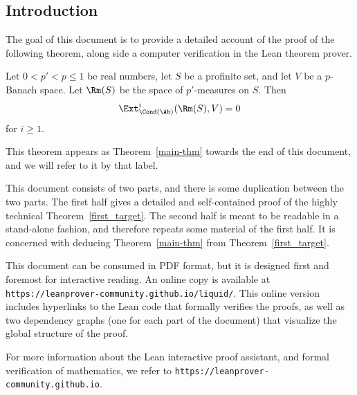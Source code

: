 \subsection*{Introduction}
\label{intro}

The goal of this document is to provide a detailed account
of the proof of the following theorem,
along side a computer verification in the Lean theorem prover.

\begin{theoremx}
  \label{main-goal}
  Let $0 < p' < p \le 1$ be real numbers,
  let $S$ be a profinite set,
  and let $V$ be a $p$-Banach space.
  Let $\Rm(S)$ be the space of $p'$-measures on $S$.
  Then
  \[
    \Ext^i_{\Cond(\Ab)}(\Rm(S), V)=0
  \]
  for $i \ge 1$.
\end{theoremx}

This theorem appears as Theorem~\ref{main-thm} towards the end of this document,
and we will refer to it by that label.

This document consists of two parts, and there is some duplication between the two parts.
The first half gives a detailed and self-contained proof of the highly technical Theorem~\ref{first_target}.
The second half is meant to be readable in a stand-alone fashion, and therefore repeats some material of the first half.
It is concerned with deducing Theorem~\ref{main-thm} from Theorem~\ref{first_target}.

This document can be consumed in PDF format,
but it is designed first and foremost for interactive reading.
An online copy is available at
\texttt{https://leanprover-community.github.io/liquid/}.
This online version includes hyperlinks to the Lean code that formally verifies the proofs,
as well as two dependency graphs (one for each part of the document) that visualize the global structure of the proof.

For more information about the Lean interactive proof assistant, and formal verification of mathematics,
we refer to \texttt{https://leanprover-community.github.io}.

